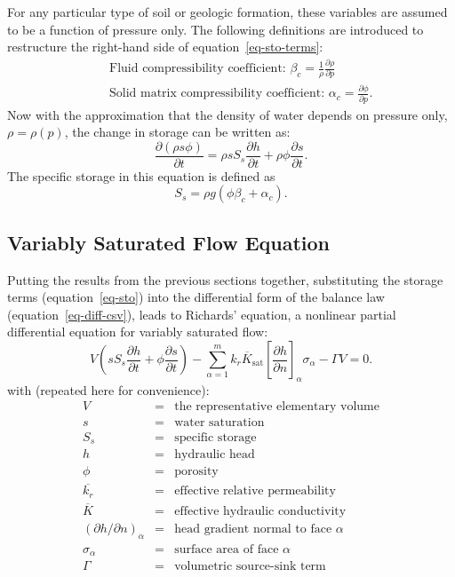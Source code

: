 \documentclass[fleqn]{article}
\begin{document}
For any particular type of soil or geologic formation, these variables
are assumed to be a function of pressure only. The following definitions
are introduced to restructure the right-hand side of
equation~\ref{eq-sto-terms}:
\begin{eqnarray*}
  &&\text{Fluid compressibility coefficient: }
  \beta_c = \frac{1}{\rho} \frac{\partial \rho}{\partial p} \\
  &&\text{Solid matrix compressibility coefficient: }
  \alpha_c = \frac{\partial \phi}{\partial p}.
\end{eqnarray*}
Now with the approximation that the density of water depends on
pressure only, $\rho = \rho(p)$, the change in storage can be written
as:
\begin{equation}
  \frac{\partial (\rho s \phi)}{\partial t} =
  \rho s S_s \frac{\partial h}{\partial t} +
  \rho \phi \frac{\partial s}{\partial t}.
  \label{eq-sto}
\end{equation}
The specific storage in this equation is defined as
\begin{equation}
  S_s = \rho g \left( \phi \beta_c + \alpha_c \right).
  \label{eq-spec-sto}
\end{equation}

\subsection{Variably Saturated Flow Equation}
Putting the results from the previous sections together,
substituting the storage terms (equation~\ref{eq-sto}) into the 
differential form of the balance law (equation~\ref{eq-diff-csv}), 
leads to Richards' equation, a nonlinear partial differential equation for 
variably saturated flow:
\begin{equation}  
  V
  \left(
  s S_s \frac{\partial h}{\partial t} + 
  \phi \frac{\partial s}{\partial t}
  \right) -
  \sum_{\alpha=1}^{m} \overline{k_r K_{\textrm{sat}}}
  \left[\frac{\partial h}{\partial n}\right]_\alpha \sigma_\alpha -
  \Gamma V = 0.
  \label{eq-unsat-flow}
\end{equation}
with (repeated here for convenience):
\begin{eqnarray*}
  V &=& \text{the representative elementary volume} \\
  s &=& \text{water saturation} \\
  S_s &=& \text{specific storage} \\
  h &=& \text{hydraulic head} \\
  \phi &=& \text{porosity} \\
  \overline{k_r} &=& \text{effective relative permeability} \\
  \overline{K} &=& \text{effective hydraulic conductivity} \\
  (\partial h/\partial n)_\alpha &=& \text{head gradient normal to face $\alpha$} \\
  \sigma_\alpha &=& \text{surface area of face $\alpha$} \\
  \Gamma &=& \text{volumetric source-sink term}
\end{eqnarray*}
\end{document}
